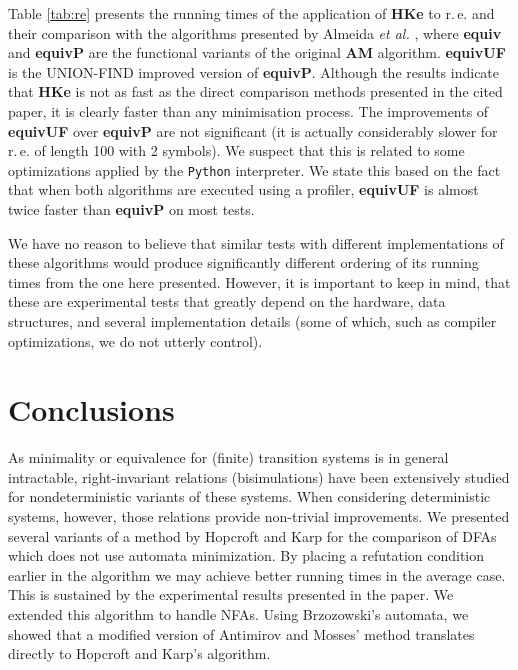 \documentclass[copyright]{eptcs}
\newcommand{\dfas}{DFAs\xspace}
\newcommand{\nfas}{NFAs\xspace}
\newcommand{\re}{r.\,e.\xspace}
\newcommand{\equivp}{\textbf{equivP}\xspace}
\newcommand{\equivuf}{\textbf{equivUF}\xspace}
\newcommand{\hke}{\textbf{HKe}\xspace}
\newcommand{\am}{\textbf{AM}\xspace}
\begin{document}
 
Table \ref{tab:re} presents the running times of the application of
\hke to \re{} and their comparison with the algorithms presented by
Almeida \emph{et al.}
\cite{almeida08_c:_antim_and_mosses_rewrit_system_revis}, where
\textbf{equiv} and \equivp are the functional variants of the original
\am algorithm. \equivuf is the UNION-FIND improved version of \equivp.
Although the results indicate that \hke{} is not as fast as the direct
comparison methods presented in the cited paper, it is clearly faster
than any minimisation process. The improvements of \equivuf over
\equivp are not significant (it is actually considerably slower for
\re of length 100 with 2 symbols). We suspect that this is related to
some optimizations applied by the \texttt{Python} interpreter. We
state this based on the fact that when both algorithms are executed
using a profiler, \equivuf is almost twice faster than \equivp on most
tests.

We have no reason to believe that similar tests with different
implementations of these algorithms would produce significantly
different ordering of its running times from the one here
presented. However, it is important to keep in mind, that these are
experimental tests that greatly depend on the hardware, data
structures, and several implementation details (some of which, such as
compiler optimizations, we do not utterly control).

\section{Conclusions}
As minimality or equivalence for (finite) transition systems is in
general intractable, right-invariant relations (bisimulations) have
been extensively studied for nondeterministic variants of these
systems. When considering deterministic systems, however, those
relations provide non-trivial improvements. We presented several
variants of a method by Hopcroft and Karp for the comparison of \dfas
which does not use automata minimization. By placing a refutation
condition earlier in the algorithm we may achieve better running times
in the average case. This is sustained by the experimental results
presented in the paper. We extended this algorithm to handle
\nfas. Using Brzozowski's automata, we showed that a modified version
of Antimirov and Mosses' method translates directly to Hopcroft and
Karp's algorithm.



\end{document}
